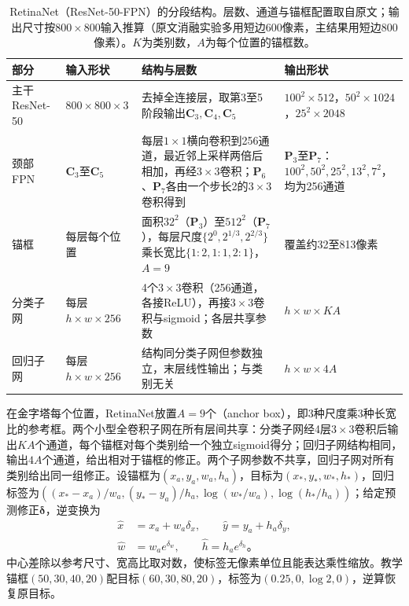\begin{table}[tbp]
 \centering
 \small
 \begin{tabularx}{\linewidth}{@{}llXl@{}}
 \toprule
 部分 & 输入形状 & 结构与层数 & 输出形状\\
 \midrule
 主干ResNet-50 & $800\times800\times3$ & 去掉全连接层，取第3至5阶段输出$\bm C_3,\bm C_4,\bm C_5$ & $100^2\times512$，$50^2\times1024$，$25^2\times2048$\\
 颈部FPN & $\bm C_3$至$\bm C_5$ & 每层$1\times1$横向卷积到256通道，最近邻上采样两倍后相加，再经$3\times3$卷积；$\bm P_6$、$\bm P_7$各由一个步长2的$3\times3$卷积得到 & $\bm P_3$至$\bm P_7$：$100^2,50^2,25^2,13^2,7^2$，均为256通道\\
 锚框 & 每层每个位置 & 面积$32^2$（$\bm P_3$）至$512^2$（$\bm P_7$），每层尺度$\{2^0,2^{1/3},2^{2/3}\}$乘长宽比$\{1{:}2,1{:}1,2{:}1\}$，$A=9$ & 覆盖约32至813像素\\
 分类子网 & 每层$h\times w\times256$ & 4个$3\times3$卷积（256通道，各接ReLU），再接$3\times3$卷积与sigmoid；各层共享参数 & $h\times w\times KA$\\
 回归子网 & 每层$h\times w\times256$ & 结构同分类子网但参数独立，末层线性输出；与类别无关 & $h\times w\times4A$\\
 \bottomrule
 \end{tabularx}
 \caption{RetinaNet（ResNet-50-FPN）的分段结构。层数、通道与锚框配置取自原文；输出尺寸按$800\times800$输入推算（原文消融实验多用短边600像素，主结果用短边800像素）。$K$为类别数，$A$为每个位置的锚框数。}
 \label{tab:vision-recognition-retinanet-structure}
\end{table}

在金字塔每个位置，RetinaNet放置$A=9$个（anchor box），即3种尺度乘3种长宽比的参考框。两个小型全卷积子网在所有层间共享：分类子网经4层$3\times3$卷积后输出$KA$个通道，每个锚框对每个类别给一个独立sigmoid得分；回归子网结构相同，输出$4A$个通道，给出相对于锚框的修正。两个子网参数不共享，回归子网对所有类别给出同一组修正。设锚框为$(x_a,y_a,w_a,h_a)$，目标为$(x_*,y_*,w_*,h_*)$，回归标签为$((x_*-x_a)/w_a,(y_*-y_a)/h_a,\log(w_*/w_a),\log(h_*/h_a))$；给定预测修正$\bm{\delta}$，逆变换为
\begin{equation}
 \begin{aligned}
 \hat x&=x_a+w_a\delta_x,\qquad \hat y=y_a+h_a\delta_y,\\
 \hat w&=w_a e^{\delta_w},\qquad \hat h=h_a e^{\delta_h}\text{。}
 \end{aligned}
 \label{eq:vision-retinanet-decode}
\end{equation}
中心差除以参考尺寸、宽高比取对数，使标签无像素单位且能表达乘性缩放。教学锚框$(50,30,40,20)$配目标$(60,30,80,20)$，标签为$(0.25,0,\log2,0)$，逆算恢复原目标。

